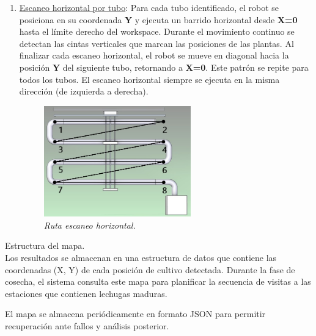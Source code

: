 \begin{enumerate}
    \item \underline{Escaneo horizontal por tubo}: Para cada tubo identificado, el robot se posiciona en su coordenada \textbf{Y} y ejecuta un barrido horizontal desde \textbf{X=0} hasta el límite derecho del workspace. Durante el movimiento continuo se detectan las cintas verticales que marcan las posiciones de las plantas.
    Al finalizar cada escaneo horizontal, el robot se mueve en diagonal hacia la posición \textbf{Y} del siguiente tubo, retornando a \textbf{X=0}. Este patrón se repite para todos los tubos. El escaneo horizontal siempre se ejecuta en la misma dirección (de izquierda a derecha).\\
        \begin{figure}[H]
        \centering
            \includegraphics[width=0.6\textwidth]{imagenes/mov_total.jpg}
            \caption{\textit{Ruta escaneo horizontal.}}
            \label{fig:estructura2}
    \end{figure}

\end{enumerate}

Estructura del mapa.\\
\noindent
Los resultados se almacenan en una estructura de datos que contiene las coordenadas (X, Y) de cada posición de cultivo detectada. Durante la fase de cosecha, el sistema consulta este mapa para planificar la secuencia de visitas a las estaciones que contienen lechugas maduras.

El mapa se almacena periódicamente en formato JSON para permitir recuperación ante fallos y análisis posterior.
